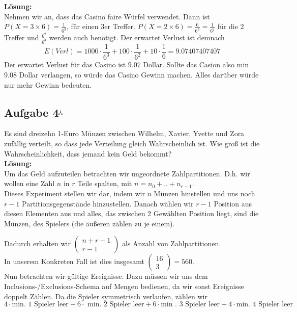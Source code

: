 \documentclass[11pt,a4paper,ngerman]{article}
\newcommand{\maxw}{$^\curlywedgedownarrow$}
\begin{document}
\textbf{Lösung:}\\

Nehmen wir an, dass das Casino faire Würfel verwendet. Dann ist
$P( X = 3\times6) = \frac{1}{6^3}$, für einen 3er Treffer. $P( X = 2 \times 6) = \frac{6}{6^3} = \frac{1}{6^2}$ für
die 2 Treffer und $\frac{6^2}{6^3}$ werden auch benötigt. Der erwartet Verlust ist demnach
\[
    E(Verl) = 1000 \cdot \frac{1}{6^3} + 100 \cdot \frac{1}{6^2} + 10 \cdot \frac{1}{6} = 9.07407407407
\]
Der erwartet Verlust für das Casino ist $9.07$ Dollar. Sollte das Casion also min $9.08$ Dollar verlangen, so
würde das Casino Gewinn machen. Alles darüber würde nur mehr Gewinn bedeuten.

\subsection*{Aufgabe 4\maxw}

Es sind dreizehn 1-Euro Münzen zwischen Wilhelm, Xavier, Yvette und Zora zufällig verteilt, so dass jede Verteilung gleich Wahrscheinlich ist.
Wie groß ist die Wahrscheinlichkeit, dass jemand kein Geld bekommt?\\

\textbf{Lösung:}\\

Um das Geld aufzuteilen betrachten wir ungeordnete Zahlpartitionen. D.h. wir wollen eine Zahl $n$ in $r$ Teile spalten, mit $n = n_0 + .. + n_{r-1}$.\\

Dieses Experiment stellen wir dar, indem wir $n$ Münzen hinstellen und uns noch $r-1$ Partitionsgegenstände hinzustellen. Danach wählen wir $r-1$ Position
aus diesen Elementen aus und alles, das zwischen 2 Gewählten Position liegt, sind die Münzen, des Spielers (die äußeren zählen zu je einem).

Dadurch erhalten wir $\left( \begin{array}{cc} n + r - 1 \\ r - 1\end{array}\right)$ als Anzahl von Zahlpartitionen.\\ In unserem Konkreten Fall ist dies
insgesamt $\begin{pmatrix} 16 \\ 3 \end{pmatrix} = 560$.\\

Nun betrachten wir gültige Ereignisse. Dazu müssen wir uns dem Inclusions-/Exclusions-Schema auf Mengen bedienen, da wir sonst Ereignisse doppelt Zählen.
Da die Spieler symmetrisch verlaufen, zählen wir
\[
    4 \cdot \text{min. 1 Spieler leer} - 6 \cdot \text{ min. 2 Spieler leer} + 6 \cdot \text{min . 3 Spieler leer} + 4 \cdot \text{min. 4 Spieler leer}
\]
\end{document}
